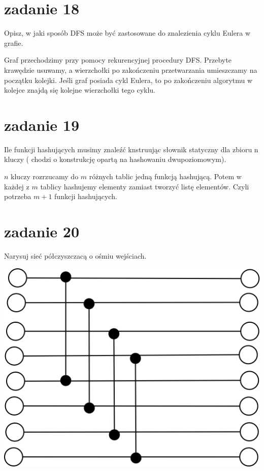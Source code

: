 \documentclass[svgnames]{report}
\begin{document}
\section{zadanie 18}
\begin{framed}
Opisz, w jaki sposób DFS może być zastosowane do znalezienia cyklu Eulera w grafie.
\end{framed}

Graf przechodzimy przy pomocy rekurencyjnej procedury DFS. Przebyte krawędzie usuwamy, a wierzchołki po zakończeniu przetwarzania umieszczamy na początku kolejki. Jeśli graf posiada cykl Eulera, to po zakończeniu algorytmu w kolejce znajdą się kolejne wierzchołki tego cyklu.

\section{zadanie 19}
\begin{framed}
Ile funkcji hashujących musimy znaleźć knstruując słownik statyczny dla zbioru n kluczy ( chodzi o konstrukcję opartą na hashowaniu dwupoziomowym).
\end{framed}

$n$ kluczy rozrzucamy do $m$ różnych tablic jedną funkcją hashującą. Potem w każdej z $m$ tablicy hashujemy elementy zamiast tworzyć listę elementów.
Czyli potrzeba $m+1$ funkcji hashujących.

\section{zadanie 20}
\begin{framed}
Narysuj sieć półczyszczacą o ośmiu wejściach.
\end{framed}

\includegraphics[scale=0.55]{images/20.png}
\end{document}
